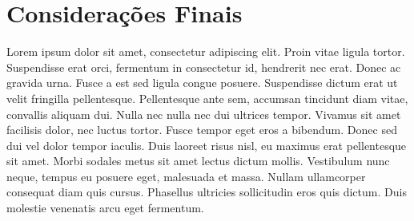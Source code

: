 
\section{Considerações Finais}

Lorem ipsum dolor sit amet, consectetur adipiscing elit. Proin vitae ligula tortor. Suspendisse erat orci, fermentum in consectetur id, hendrerit nec erat. Donec ac gravida urna. Fusce a est sed ligula congue posuere. Suspendisse dictum erat ut velit fringilla pellentesque. Pellentesque ante sem, accumsan tincidunt diam vitae, convallis aliquam dui. Nulla nec nulla nec dui ultrices tempor. Vivamus sit amet facilisis dolor, nec luctus tortor. Fusce tempor eget eros a bibendum. Donec sed dui vel dolor tempor iaculis. Duis laoreet risus nisl, eu maximus erat pellentesque sit amet. Morbi sodales metus sit amet lectus dictum mollis. Vestibulum nunc neque, tempus eu posuere eget, malesuada et massa. Nullam ullamcorper consequat diam quis cursus. Phasellus ultricies sollicitudin eros quis dictum. Duis molestie venenatis arcu eget fermentum.

\newpage


